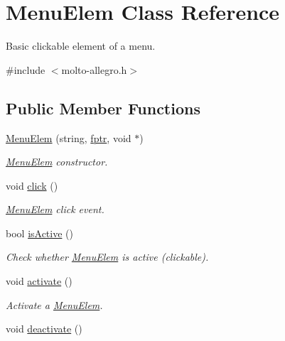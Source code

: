 \hypertarget{classMenuElem}{\section{Menu\-Elem Class Reference}
\label{classMenuElem}
}


Basic clickable element of a menu.  




{\ttfamily \#include $<$molto-\/allegro.\-h$>$}

\subsection*{Public Member Functions}
\begin{DoxyCompactItemize}
\item 
\hyperlink{classMenuElem_ab62423ecda024bc17399a2516df78520}{Menu\-Elem} (string, \hyperlink{molto-allegro_8h_ab4d4c3a68df99ae93deb075950a7e396}{fptr}, void $\ast$)
\begin{DoxyCompactList}\small\item\em \hyperlink{classMenuElem}{Menu\-Elem} constructor. \end{DoxyCompactList}\item 
\hypertarget{classMenuElem_a85a05adaaa88ec6cd69fdae4872cdab6}{void \hyperlink{classMenuElem_a85a05adaaa88ec6cd69fdae4872cdab6}{click} ()}\label{classMenuElem_a85a05adaaa88ec6cd69fdae4872cdab6}

\begin{DoxyCompactList}\small\item\em \hyperlink{classMenuElem}{Menu\-Elem} click event. \end{DoxyCompactList}\item 
bool \hyperlink{classMenuElem_aebd7405f62e80fbcd9c7dd9a10dfae25}{is\-Active} ()
\begin{DoxyCompactList}\small\item\em Check whether \hyperlink{classMenuElem}{Menu\-Elem} is active (clickable). \end{DoxyCompactList}\item 
\hypertarget{classMenuElem_a58fea924596d1297fc61c334e5507642}{void \hyperlink{classMenuElem_a58fea924596d1297fc61c334e5507642}{activate} ()}\label{classMenuElem_a58fea924596d1297fc61c334e5507642}

\begin{DoxyCompactList}\small\item\em Activate a \hyperlink{classMenuElem}{Menu\-Elem}. \end{DoxyCompactList}\item 
\hypertarget{classMenuElem_a7a060cffe47f9fcb427d45c082602e9f}{void \hyperlink{classMenuElem_a7a060cffe47f9fcb427d45c082602e9f}{deactivate} ()}\label{classMenuElem_a7a060cffe47f9fcb427d45c082602e9f}


\end{DoxyCompactItemize}
